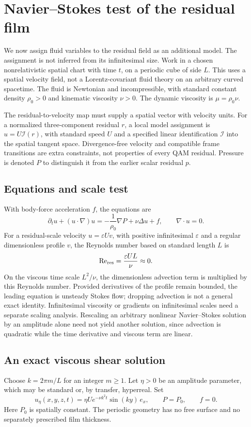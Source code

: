 \documentclass[11pt,a4paper]{article}
\begin{document}
\section{Navier--Stokes test of the residual film}
\label{sec:fluid-test}
We now assign fluid variables to the residual field as an additional model.
The assignment is not inferred from its infinitesimal size. Work in a chosen
nonrelativistic spatial chart with time $t$, on a periodic cube of side $L$.
This uses a spatial velocity field, not a Lorentz-covariant fluid theory on
an arbitrary curved spacetime. The fluid is Newtonian and incompressible,
with standard constant density $\rho_0>0$ and kinematic viscosity $\nu>0$.
The dynamic viscosity is $\mu=\rho_0\nu$.

The residual-to-velocity map must supply a spatial vector with velocity units.
For a normalized three-component residual $r$, a local model assignment is
$u=U\mathcal I(r)$, with standard speed $U$ and a specified linear
identification $\mathcal I$ into the spatial tangent space. Divergence-free
velocity and compatible frame transitions are extra constraints, not
properties of every QAM residual. Pressure is denoted $P$ to distinguish it
from the earlier scalar residual $p$.

\subsection{Equations and scale test}
With body-force acceleration $f$, the equations are
\[
\partial_t u+(u\cdot\nabla)u
=-\frac1{\rho_0}\nabla P+\nu\Delta u+f,
\qquad \nabla\cdot u=0.
\]
For a residual-scale velocity $u=\varepsilon U v$, with positive
infinitesimal $\varepsilon$ and a regular dimensionless profile $v$,
the Reynolds number based on standard length $L$ is
\[
\mathrm{Re}_{\rm res}=\frac{\varepsilon UL}{\nu}\approx0.
\]
On the viscous time scale $L^2/\nu$, the dimensionless advection term is
multiplied by this Reynolds number. Provided derivatives of the profile
remain bounded, the leading equation is unsteady Stokes flow; dropping
advection is not a general exact identity.
Infinitesimal viscosity or gradients on infinitesimal scales need a separate
scaling analysis. Rescaling an arbitrary nonlinear Navier--Stokes solution
by an amplitude alone need not yield another solution, since advection is
quadratic while the time derivative and viscous term are linear.

\subsection{An exact viscous shear solution}
Choose $k=2\pi m/L$ for an integer $m\ge1$. Let $\eta>0$ be an amplitude
parameter, which may be standard or, by transfer, hyperreal. Set
\[
u_\eta(x,y,z,t)
=\eta U e^{-\nu k^2t}\sin(ky)\,e_x,
\qquad P=P_0,\qquad f=0.
\]
Here $P_0$ is spatially constant. The periodic geometry has no free surface
and no separately prescribed film thickness.
\end{document}
